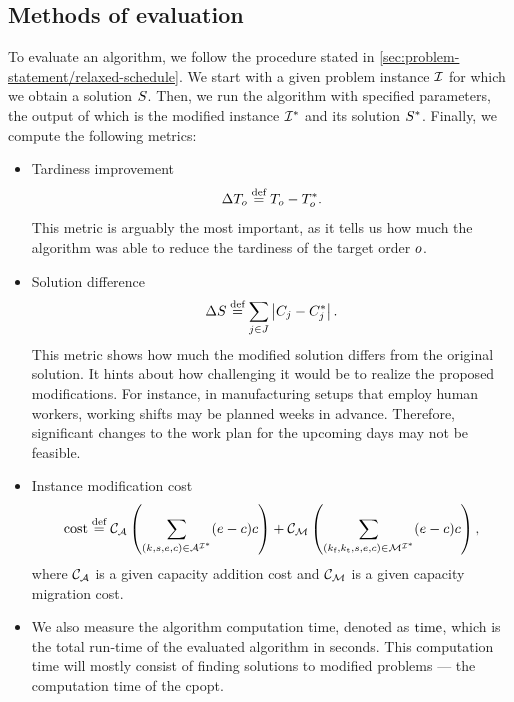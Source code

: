 \subsection{Methods of evaluation} \label{subsec:numerical-experiments/setup/methods-of-evaluation}

To evaluate an algorithm, we follow the procedure stated in \cref{sec:problem-statement/relaxed-schedule}.
We start with a given problem instance $\mathcal{I}$ for which we obtain a solution $S$.
Then, we run the algorithm with specified parameters,
the output of which is the modified instance $\mathcal{I}^*$ and its solution $S^*$.
Finally, we compute the following metrics:
\begin{itemize}
    \item
        Tardiness improvement
        $$
        \Delta T_{o} \overset{\text{def}}{=} T_{o} - T_{o}^*.
        $$
        This metric is arguably the most important, as it tells us how much the algorithm was able
        to reduce the tardiness of the target order $o$.
    
    \item
        Solution difference
        $$
        \Delta S_{} \overset{\text{def}}{=} \sum_{j \in J} \left|{C_{j} - C_{j}^*}\right|.
        $$
        This metric shows how much the modified solution differs from the original solution.
        It hints about how challenging it would be to realize the proposed modifications.
        For instance, in manufacturing setups that employ human workers,
        working shifts may be planned weeks in advance.
        Therefore, significant changes to the work plan for the upcoming days
        may not be feasible.

    \item
        Instance modification cost
        $$
        \operatorname{cost} \overset{\text{def}}{=}
            \mathcal{C}_{\mathcal{A}} \left(
                \sum_{(k, s, e, c) \in \mathcal{A}^{\mathcal{I}^*}} (e - c) c
            \right)
            +
            \mathcal{C}_{\mathcal{M}} \left(
                \sum_{(k_\text{f}, k_\text{t}, s, e, c) \in \mathcal{M}^{\mathcal{I}^*}} (e - c) c
            \right),
        $$
        where $\mathcal{C}_{\mathcal{A}}$ is a given capacity addition cost
        and $\mathcal{C}_{\mathcal{M}}$ is a given capacity migration cost.

    \item 
        We also measure the algorithm computation time, denoted as $\operatorname{time}$,
        which is the total run-time of the evaluated algorithm in seconds.
        This computation time will mostly consist of finding solutions to modified problems ---
        the computation time of the \ac{cpopt}.
\end{itemize}

